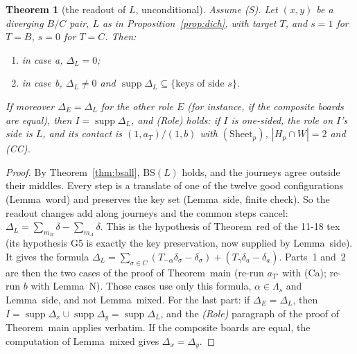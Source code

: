 \documentclass[11pt]{article}
\newtheorem{theorem}{Theorem}\newtheorem{lemma}[theorem]{Lemma}\newtheorem{proposition}[theorem]{Proposition}
\theoremstyle{definition}\newtheorem{definition}[theorem]{Definition}\newtheorem{remark}[theorem]{Remark}
\begin{document}
\begin{theorem}[the readout of $L$, unconditional]\label{thm:roleL}
Assume (S). Let $(x,y)$ be a diverging $B/C$ pair, $L$ as in Proposition~\ref{prop:dich}, with target $T$, and $s=1$ for $T=B$, $s=0$ for $T=C$. Then:
\begin{enumerate}
\item in case a, $\Delta_L=0$;
\item in case b, $\Delta_L\ne0$ and $\operatorname{supp}\Delta_L\subseteq\{\text{keys of side }s\}$.
\end{enumerate}
If moreover $\Delta_E=\Delta_L$ for the other role $E$ (for instance, if the composite boards are equal), then $I=\operatorname{supp}\Delta_L$, and (Role) holds: if $I$ is one-sided, the role on $I$'s side is $L$, and its contact is $(1,a_T)/(1,b)$ with $(\mathrm{Sheet}_p)$, $|H_p\cap W|=2$ and (CC).
\end{theorem}
\begin{proof}
By Theorem~\ref{thm:bsall}, BS$(L)$ holds, and the journeys agree outside their middles. Every step is a translate of one of the twelve good configurations (Lemma~word) and preserves the key set (Lemma~side, finite check). So the readout changes add along journeys and the common steps cancel: $\Delta_L=\sum_{m_B}\delta-\sum_{m_A}\delta$. This is the hypothesis of Theorem~red of the 11-18 tex (its hypothesis G5 is exactly the key preservation, now supplied by Lemma~side). It gives the formula $\Delta_L=\sum_{\sigma\in C}(T_{-\alpha}\delta_\sigma-\delta_\sigma)+(T_\gamma\delta_a-\delta_a)$. Parts~1 and~2 are then the two cases of the proof of Theorem~main (re-run $a_{T'}$ with (Ca); re-run $b$ with Lemma~N). Those cases use only this formula, $\alpha\in\Lambda_s$ and Lemma~side, and not Lemma~mixed.
For the last part: if $\Delta_E=\Delta_L$, then $I=\operatorname{supp}\Delta_x\cup\operatorname{supp}\Delta_y=\operatorname{supp}\Delta_L$, and the \emph{(Role)} paragraph of the proof of Theorem~main applies verbatim. If the composite boards are equal, the computation of Lemma~mixed gives $\Delta_x=\Delta_y$.
\end{proof}
\end{document}
